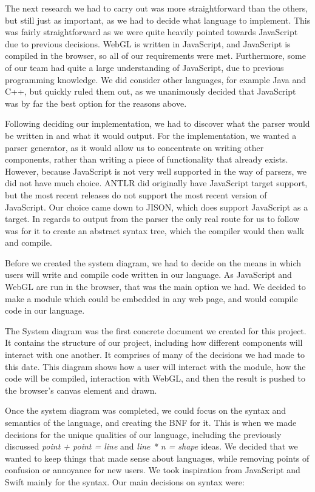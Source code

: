 \documentclass{l3proj}
\begin{document}
The next research we had to carry out was more straightforward than the others, but still just as important, as we had to decide what language to implement. This was fairly straightforward as we were quite heavily pointed towards JavaScript due to previous decisions. WebGL is written in JavaScript, and JavaScript is compiled in the browser, so all of our requirements were met. Furthermore, some of our team had quite a large understanding of JavaScript, due to previous programming knowledge. We did consider other languages, for example Java and C++, but quickly ruled them out, as we unanimously decided that JavaScript was by far the best option for the reasons above. 

Following deciding our implementation, we had to discover what the parser would be written in and what it would output. For the implementation, we wanted a parser generator, as it would allow us to concentrate on writing other components, rather than writing a piece of functionality that already exists. However, because JavaScript is not very well supported in the way of parsers, we did not have much choice. ANTLR did originally have JavaScript target support, but the most recent releases do not support the most recent version of JavaScript. Our choice came down to JISON, which does support JavaScript as a target. In regards to output from the parser the only real route for us to follow was for it to create an abstract syntax tree, which the compiler would then walk and compile.

Before we created the system diagram, we had to decide on the means in which users will write and compile code written in our language. As JavaScript and WebGL are run in the browser, that was the main option we had. We decided to make a module which could be embedded in any web page, and would compile code in our language.

The System diagram was the first concrete document we created for this project. It contains the structure of our project, including how different components will interact with one another. It comprises of many of the decisions we had made to this date. This diagram shows how a user will interact with the module, how the code will be compiled, interaction with WebGL, and then the result is pushed to the browser's canvas element and drawn.

Once the system diagram was completed, we could focus on the syntax and semantics of the language, and creating the BNF for it. This is when we made decisions for the unique qualities of our language, including the previously discussed \textit{point + point = line} and \textit{line * n = shape} ideas. We decided that we wanted to keep things that made sense about languages, while removing points of confusion or annoyance for new users. We took inspiration from JavaScript and Swift mainly for the syntax. Our main decisions on syntax were:
\end{document}
